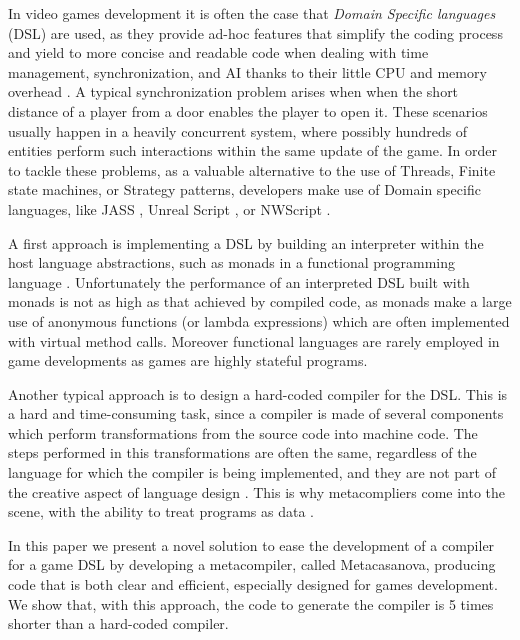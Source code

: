 In video games development it is often the case that  \textit{Domain
Specific languages} (DSL) are used, as they provide ad-hoc features
that simplify the coding process and yield to more concise and
readable code when dealing with  time management, synchronization, and
AI thanks to their little CPU and memory overhead
\cite{DSL_SURVEY_PAPER, GAME_SCRIPTING, CASANOVA2_PAPER} . A typical
synchronization problem arises when when the short distance of a player from a door enables
the player to open it. These scenarios usually happen in a heavily
concurrent system, where possibly hundreds of entities perform such
interactions within the same update of the game. In order to tackle
these problems, as a valuable alternative to the use of Threads,
Finite state machines, or Strategy patterns, developers make use of
Domain specific languages, like JASS \cite{JASS}, Unreal Script \cite{UNREAL_ENGINE},
or NWScript \cite{NW_SCRIPT}.

A first approach is implementing a DSL by
building an interpreter within the host language abstractions, such as
monads in a functional programming language \cite{DSL_MONAD_PAPER,
CASANOVA1_PAPER, SCRIPT_MONAD_PAPER}. Unfortunately the performance of
an interpreted DSL built with monads is not as high as that achieved
by compiled code, as monads make a large use of anonymous functions
(or lambda expressions) which are often implemented with virtual
method calls. Moreover functional languages are rarely employed in
game developments as games are highly stateful programs.

Another typical approach is to design a hard-coded compiler for the
DSL. This is a hard and time-consuming task, since a compiler is made
of several components which perform transformations from the source
code into machine code. The steps performed in this transformations
are often the same, regardless of the language for which the compiler
is being implemented, and they are not part of the creative aspect of
language design \cite{CWIC}. This is why metacompliers come into the
scene, with the ability to treat programs as data
\cite{GENERATIVE_PROGRAMMING_CZARNECKI}.

In this paper we present a novel solution to ease the development of a
compiler for a game DSL by developing a metacompiler, called Metacasanova, producing code
that is both clear and efficient, especially designed for games
development. We show that, with this approach, the code to generate the compiler is 5 times shorter than a hard-coded compiler.

